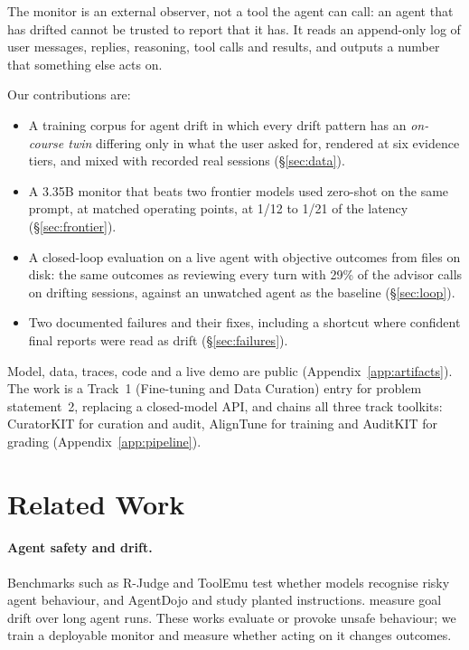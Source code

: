 \documentclass[11pt]{article}
\begin{document}
The monitor is an external observer, not a tool the agent can call: an agent that has drifted cannot be trusted to report that it has. It reads an append-only log of user messages, replies, reasoning, tool calls and results, and outputs a number that something else acts on.

Our contributions are:
\begin{itemize}\itemsep0pt
\item A training corpus for agent drift in which every drift pattern has an \emph{on-course twin} differing only in what the user asked for, rendered at six evidence tiers, and mixed with recorded real sessions (\S\ref{sec:data}).
\item A 3.35B monitor that beats two frontier models used zero-shot on the same prompt, at matched operating points, at 1/12 to 1/21 of the latency (\S\ref{sec:frontier}).
\item A closed-loop evaluation on a live agent with objective outcomes from files on disk: the same outcomes as reviewing every turn with 29\% of the advisor calls on drifting sessions, against an unwatched agent as the baseline (\S\ref{sec:loop}).
\item Two documented failures and their fixes, including a shortcut where confident final reports were read as drift (\S\ref{sec:failures}).
\end{itemize}
Model, data, traces, code and a live demo are public (Appendix~\ref{app:artifacts}). The work is a Track~1 (Fine-tuning and Data Curation) entry for problem statement~2, replacing a closed-model API, and chains all three track toolkits: CuratorKIT \citep{curatorkit} for curation and audit, AlignTune \citep{aligntune} for training and AuditKIT \citep{auditkit} for grading (Appendix~\ref{app:pipeline}).

\section{Related Work}

\paragraph{Agent safety and drift.} Benchmarks such as R-Judge \citep{yuan2024rjudge} and ToolEmu \citep{ruan2024toolemu} test whether models recognise risky agent behaviour, and AgentDojo \citep{debenedetti2024agentdojo} and \citet{greshake2023indirect} study planted instructions. \citet{arike2025goaldrift} measure goal drift over long agent runs. These works evaluate or provoke unsafe behaviour; we train a deployable monitor and measure whether acting on it changes outcomes.
\end{document}
